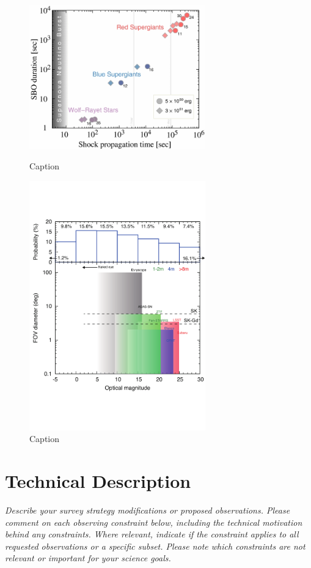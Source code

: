 \documentclass[12pt, letterpaper]{article}
\begin{document}
\begin{figure}
  \begin{center}
    \begin{minipage}[b]{3.1in}
      \includegraphics[width=3.0in]{apj487119f2_hr}
      \caption{Caption}
      \label{fig:delay-times}
    \end{minipage}
    \begin{minipage}[b]{3.1in}
      \includegraphics[width=3.0in]{fig9}
      \caption{Caption}
      \label{fig:multimessenger-comparison}
    \end{minipage}
  \end{center}
\end{figure}

\clearpage

\newpage
\section{Technical Description}
\begin{footnotesize}
{\it Describe your survey strategy modifications or proposed observations. Please comment on each observing constraint
below, including the technical motivation behind any constraints. Where relevant, indicate
if the constraint applies to all requested observations or a specific subset. Please note which 
constraints are not relevant or important for your science goals.}
\end{footnotesize}
\end{document}
